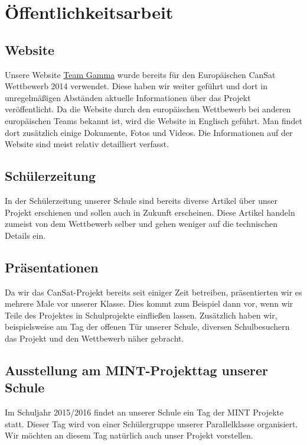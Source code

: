 \section{Öffentlichkeitsarbeit}
\subsection{Website}
Unsere Website \href{www.team-gamma.de}{Team Gamma} wurde bereits für den Europäischen CanSat Wettbewerb 2014 verwendet. Diese haben wir weiter geführt und dort in unregelmäßigen Abständen aktuelle Informationen über das Projekt veröffentlicht. Da die Website durch den europäischen Wettbewerb bei anderen europäischen Teams bekannt ist, wird die Website in Englisch geführt. Man findet dort zusätzlich einige Dokumente, Fotos und Videos. Die Informationen auf der Website sind meist relativ detailliert verfasst. 

\subsection{Schülerzeitung}
In der Schülerzeitung unserer Schule sind bereits diverse Artikel über unser Projekt erschienen und sollen auch in Zukunft erscheinen. Diese Artikel handeln zumeist von dem Wettbewerb selber und gehen weniger auf die technischen Details ein.

\subsection{Präsentationen}
Da wir das CanSat-Projekt bereits seit einiger Zeit betreiben, präsentierten wir es mehrere Male vor unserer Klasse. Dies kommt zum Beispiel dann vor, wenn wir Teile des Projektes in Schulprojekte einfließen lassen. Zusätzlich haben wir, beispielsweise am Tag der offenen Tür unserer Schule, diversen Schulbesuchern das Projekt und den Wettbewerb näher gebracht.

\subsection{Ausstellung am MINT-Projekttag unserer Schule}
Im Schuljahr 2015/2016 findet an unserer Schule ein Tag der MINT Projekte statt. Dieser Tag wird von einer Schülergruppe unserer Parallelklasse organisiert. Wir möchten an diesem Tag natürlich auch unser Projekt vorstellen.

